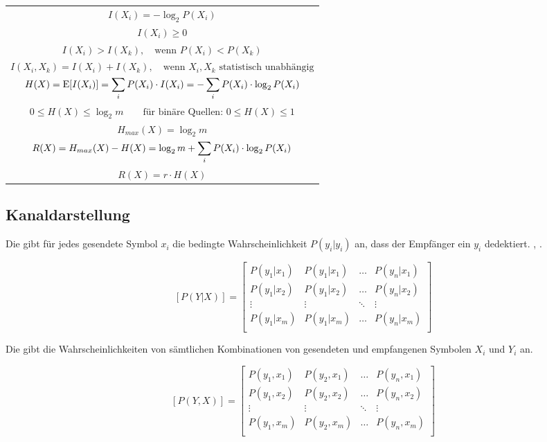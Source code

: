 \documentclass[a4paper]{article}
\begin{document}
\begin{twocolumn}
\begin{center}
\begin{tabular}{c}
  $I(X_i) = -\log_2{P(X_i)}$ \\
  $I(X_i) \geq 0$ \\
  $I(X_i) > I(X_k), \quad \text{wenn } P(X_i) < P(X_k)$ \\
  $I(X_i, X_k) = I(X_i) + I(X_k), \quad \text{wenn } X_i, X_k \text{ statistisch unabhängig}$ \\
  $\displaystyle H(X) = \operatorname{E}[I(X_i)] = \sum_i P(X_i) \cdot I(X_i) = - \sum_i P(X_i) \cdot \log_2{ P(X_i)}$ \\
  $0 \leq H(X) \leq \log_2{m} \qquad \text{für binäre Quellen: } 0 \leq H(X) \leq 1$ \\
  $H_{max}(X) = \log_2{m}$ \\
  $\displaystyle R(X) = H_{max}(X) - H(X) = \log_2{m} + \sum_i P(X_i) \cdot \log_2{P(X_i)}$ \\
  $R(X) = r \cdot H(X)$
\end{tabular}
\end{center}

\subsection{Kanaldarstellung}

Die  gibt für jedes gesendete Symbol $x_i$ die bedingte Wahrscheinlichkeit 
$P(y_i|y_i)$ an, dass der Empfänger ein $y_i$ dedektiert. , .

$$[P(Y|X)] = \left[ \begin{array}{cccc} 
  P(y_1|x_1) & P(y_1|x_1) & \ldots & P(y_n|x_1) \\
  P(y_1|x_2) & P(y_1|x_2) & \ldots & P(y_n|x_2) \\
  \vdots & \vdots & \ddots & \vdots \\
  P(y_1|x_m) & P(y_1|x_m) & \ldots & P(y_n|x_m) \\
\end{array} \right]$$

Die  gibt die Wahrscheinlichkeiten von sämtlichen Kombinationen von gesendeten 
und empfangenen Symbolen $X_i$ und $Y_i$ an.

$$[P(Y,X)] = \left[ \begin{array}{cccc} 
  P(y_1,x_1) & P(y_2,x_1) & \ldots & P(y_n,x_1) \\
  P(y_1,x_2) & P(y_2,x_2) & \ldots & P(y_n,x_2) \\
  \vdots & \vdots & \ddots & \vdots \\
  P(y_1,x_m) & P(y_2,x_m) & \ldots & P(y_n,x_m) \\
\end{array} \right]$$


\end{twocolumn}
\end{document}
